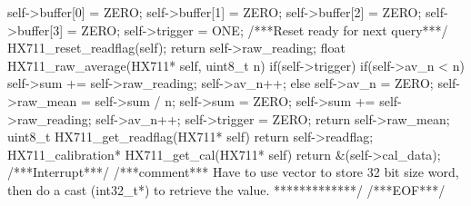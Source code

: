 \begin{verbatimtab}
{{{{				self->buffer[0] = ZERO;
				self->buffer[1] = ZERO;
				self->buffer[2] = ZERO;
				self->buffer[3] = ZERO;
				self->trigger = ONE;
				/***Reset ready for next query***/
				HX711_reset_readflag(self);
			}
		}
	}
	return self->raw_reading;
}
float HX711_raw_average(HX711* self, uint8_t n)
{
	if(self->trigger){
		if(self->av_n < n){
			self->sum += self->raw_reading;
			self->av_n++;
		}else{
			self->av_n = ZERO;
			self->raw_mean = self->sum / n;
			self->sum = ZERO;
			self->sum += self->raw_reading;
			self->av_n++;
		}
		self->trigger = ZERO;
	}
	return self->raw_mean;
}
uint8_t HX711_get_readflag(HX711* self)
{
	return self->readflag;
}
HX711_calibration* HX711_get_cal(HX711* self)
{
	return &(self->cal_data);
}
/***Interrupt***/
/***comment***
Have to use vector to store 32 bit size word, then do a cast (int32_t*)
to retrieve the value.
*************/
/***EOF***/
\end{verbatimtab}